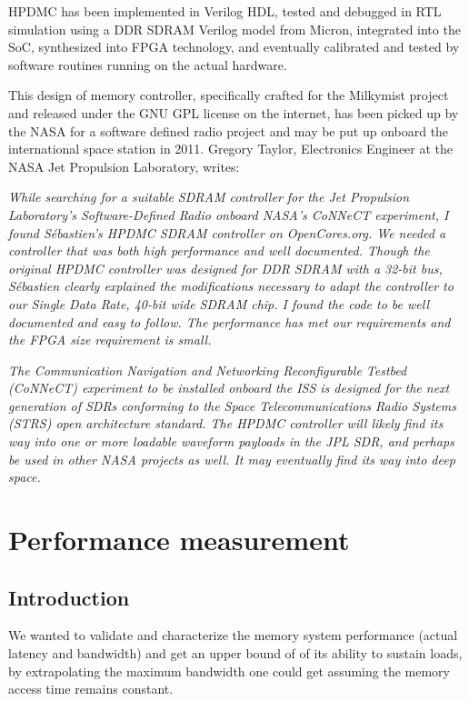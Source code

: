 \documentclass[a4paper,11pt]{kthesis}
\begin{document}
HPDMC has been implemented in Verilog HDL, tested and debugged in RTL simulation using a DDR SDRAM Verilog model from Micron, integrated into the SoC, synthesized into FPGA technology, and eventually calibrated and tested by software routines running on the actual hardware.

This design of memory controller, specifically crafted for the Milkymist project and released under the GNU GPL license on the internet, has been picked up by the NASA for a software defined radio project and may be put up onboard the international space station in 2011. Gregory Taylor, Electronics Engineer at the NASA Jet Propulsion Laboratory, writes:

\textit{While searching for a suitable SDRAM controller for the Jet Propulsion Laboratory's Software-Defined Radio onboard NASA's CoNNeCT experiment, I found S\'ebastien's HPDMC SDRAM controller on OpenCores.org. We needed a controller that was both high performance and well documented. Though the original HPDMC controller was designed for DDR SDRAM with a 32-bit bus, S\'ebastien clearly explained the modifications necessary to adapt the controller to our Single Data Rate, 40-bit wide SDRAM chip. I found the code to be well documented and easy to follow. The performance has met our requirements and the FPGA size requirement is small.}

\textit{The Communication Navigation and Networking Reconfigurable Testbed (CoNNeCT) experiment to be installed onboard the ISS is designed for the next generation of SDRs conforming to the Space Telecommunications Radio Systems (STRS) open architecture standard. The HPDMC controller will likely find its way into one or more loadable waveform payloads in the JPL SDR, and perhaps be used in other NASA projects as well. It may eventually find its way into deep space.}

\section{Performance measurement}
\label{sec:memperf}
\subsection{Introduction}
We wanted to validate and characterize the memory system performance (actual latency and bandwidth) and get an upper bound of of its ability to sustain loads, by extrapolating the maximum bandwidth one could get assuming the memory access time remains constant.
\end{document}
